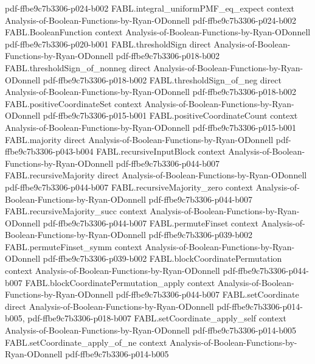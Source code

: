 \begin{theorem}
  {pdf-ffbe9c7b3306-p024-b002}
\proofstep
  {FABL.integral_uniformPMF_eq_expect}
  {context}
  {Analysis-of-Boolean-Functions-by-Ryan-ODonnell}
  {pdf-ffbe9c7b3306-p024-b002}
\proofstep
  {FABL.BooleanFunction}
  {context}
  {Analysis-of-Boolean-Functions-by-Ryan-ODonnell}
  {pdf-ffbe9c7b3306-p020-b001}
\proofstep
  {FABL.thresholdSign}
  {direct}
  {Analysis-of-Boolean-Functions-by-Ryan-ODonnell}
  {pdf-ffbe9c7b3306-p018-b002}
\proofstep
  {FABL.thresholdSign_of_nonneg}
  {direct}
  {Analysis-of-Boolean-Functions-by-Ryan-ODonnell}
  {pdf-ffbe9c7b3306-p018-b002}
\proofstep
  {FABL.thresholdSign_of_neg}
  {direct}
  {Analysis-of-Boolean-Functions-by-Ryan-ODonnell}
  {pdf-ffbe9c7b3306-p018-b002}
\proofstep
  {FABL.positiveCoordinateSet}
  {context}
  {Analysis-of-Boolean-Functions-by-Ryan-ODonnell}
  {pdf-ffbe9c7b3306-p015-b001}
\proofstep
  {FABL.positiveCoordinateCount}
  {context}
  {Analysis-of-Boolean-Functions-by-Ryan-ODonnell}
  {pdf-ffbe9c7b3306-p015-b001}
\proofstep
  {FABL.majority}
  {direct}
  {Analysis-of-Boolean-Functions-by-Ryan-ODonnell}
  {pdf-ffbe9c7b3306-p043-b004}
\proofstep
  {FABL.recursiveInputBlock}
  {context}
  {Analysis-of-Boolean-Functions-by-Ryan-ODonnell}
  {pdf-ffbe9c7b3306-p044-b007}
\proofstep
  {FABL.recursiveMajority}
  {direct}
  {Analysis-of-Boolean-Functions-by-Ryan-ODonnell}
  {pdf-ffbe9c7b3306-p044-b007}
\proofstep
  {FABL.recursiveMajority_zero}
  {context}
  {Analysis-of-Boolean-Functions-by-Ryan-ODonnell}
  {pdf-ffbe9c7b3306-p044-b007}
\proofstep
  {FABL.recursiveMajority_succ}
  {context}
  {Analysis-of-Boolean-Functions-by-Ryan-ODonnell}
  {pdf-ffbe9c7b3306-p044-b007}
\proofstep
  {FABL.permuteFinset}
  {context}
  {Analysis-of-Boolean-Functions-by-Ryan-ODonnell}
  {pdf-ffbe9c7b3306-p039-b002}
\proofstep
  {FABL.permuteFinset_symm}
  {context}
  {Analysis-of-Boolean-Functions-by-Ryan-ODonnell}
  {pdf-ffbe9c7b3306-p039-b002}
\proofstep
  {FABL.blockCoordinatePermutation}
  {context}
  {Analysis-of-Boolean-Functions-by-Ryan-ODonnell}
  {pdf-ffbe9c7b3306-p044-b007}
\proofstep
  {FABL.blockCoordinatePermutation_apply}
  {context}
  {Analysis-of-Boolean-Functions-by-Ryan-ODonnell}
  {pdf-ffbe9c7b3306-p044-b007}
\proofstep
  {FABL.setCoordinate}
  {direct}
  {Analysis-of-Boolean-Functions-by-Ryan-ODonnell}
  {pdf-ffbe9c7b3306-p014-b005,
    pdf-ffbe9c7b3306-p018-b007}
\proofstep
  {FABL.setCoordinate_apply_self}
  {context}
  {Analysis-of-Boolean-Functions-by-Ryan-ODonnell}
  {pdf-ffbe9c7b3306-p014-b005}
\proofstep
  {FABL.setCoordinate_apply_of_ne}
  {context}
  {Analysis-of-Boolean-Functions-by-Ryan-ODonnell}
  {pdf-ffbe9c7b3306-p014-b005}

\end{theorem}
